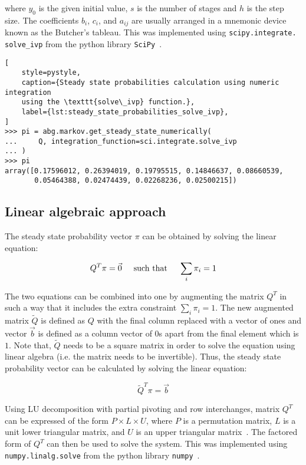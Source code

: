 where \(y_0\) is the given initial value, \(s\) is the number of stages and
\(h\) is the step size.
The coefficients \(b_i\), \(c_i\), and \(a_{ij}\) are usually arranged in a
mnemonic device known as the Butcher's tableau.
This was implemented using \texttt{scipy.integrate. solve\_ivp} from the python
library \texttt{SciPy}~\cite{2020SciPy-NMeth}.

\begin{lstlisting}[
    style=pystyle,
    caption={Steady state probabilities calculation using numeric integration
    using the \texttt{solve\_ivp} function.},
    label={lst:steady_state_probabilities_solve_ivp},
]
>>> pi = abg.markov.get_steady_state_numerically(
...     Q, integration_function=sci.integrate.solve_ivp
... )
>>> pi
array([0.17596012, 0.26394019, 0.19795515, 0.14846637, 0.08660539,
       0.05464388, 0.02474439, 0.02268236, 0.02500215])

\end{lstlisting}


\subsection{Linear algebraic approach}

The steady state probability vector \( \pi \) can be obtained by solving the
linear equation:

\begin{equation}\label{eq:numpy_linalg_solve_1}
    Q^T \pi = \vec{0} \hspace{0.5cm} \text{such that} \hspace{0.5cm}
    \sum_{i} \pi_i = 1
\end{equation}

The two equations can be combined into one by augmenting the matrix \( Q^T \)
in such a way that it includes the extra constraint \( \sum_i \pi_i = 1 \).
The new augmented matrix \(\tilde Q\) is defined as \(Q\) with the final
column replaced with a vector of ones and vector \(\vec{b}\) is defined
as a column vector of \(0\)s apart from the final element which is \(1\).
Note that, \(\tilde Q\) needs to be a square matrix in order to solve the
equation using linear algebra (i.e. the matrix needs to be invertible).
Thus, the steady state probability vector can be calculated by solving the
linear equation:

\begin{equation}
    \tilde Q^T \pi = \vec{b}
\end{equation}

Using LU decomposition with partial pivoting and row interchanges, matrix
\(Q^T\) can be expressed of the form \(P \times L \times U\), where \(P\) is
a permutation matrix, \(L\) is a unit lower triangular matrix, and \(U\) is
an upper triangular matrix~\cite{strang2006linear}.
The factored form of \(Q^T\) can then be used to solve the system.
This was implemented using \texttt{numpy.linalg.solve} from the
python library \texttt{numpy}~\cite{2020NumPy-Array, lapack99}.


